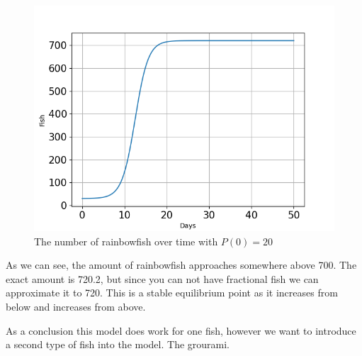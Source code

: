 \begin{figure}[H]
    \centering
    \includegraphics[scale=0.4]{../figures/Figure_1.png}
    \caption{The number of rainbowfish over time with $P(0)=20$}
\end{figure}

\begin{flushleft}
    As we can see, the amount of rainbowfish approaches somewhere
    above 700.
    The exact amount is 720.2, but since you can not have
    fractional fish we can approximate it to 720. This is
    a stable equilibrium point as it increases from below
    and increases from above.
\end{flushleft}

\begin{flushleft}
    As a conclusion this model does work for one fish,
    however we want to introduce a second type of fish
    into the model. The grourami.
\end{flushleft}



